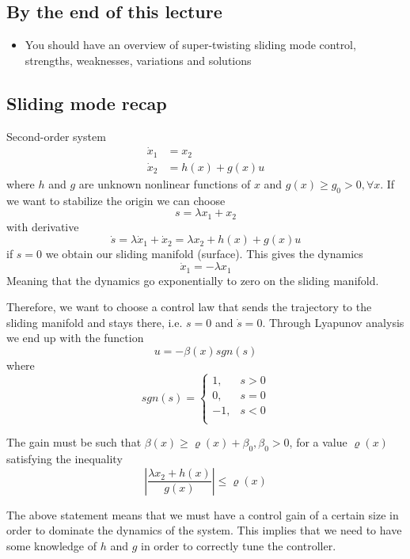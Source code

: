 \subsection{By the end of this lecture}
\begin{itemize}
    \item You should have an overview of super-twisting sliding mode control, strengths, weaknesses, variations and solutions
\end{itemize}

\subsection{Sliding mode recap}
Second-order system 
\begin{equation*}
    \begin{split}
        \dot{x}_1 &= x_2 \\
        \dot{x}_2 &= h(x) + g(x)u
    \end{split}
\end{equation*}
where $h$ and $g$ are unknown nonlinear functions of $x$ and $g(x) \geq g_0 > 0, \forall x$. If we want to stabilize the origin we can choose 
\begin{equation*}
    s = \lambda x_1 + x_2
\end{equation*}
with derivative 
\begin{equation*}
    \dot{s} = \lambda\dot{x}_1 + \dot{x}_2 = \lambda x_2 + h(x) + g(x)u
\end{equation*}
if $s = 0$ we obtain our sliding manifold (surface). 
This gives the dynamics
\begin{equation*}
    \dot{x}_1 = -\lambda x_1
\end{equation*}
Meaning that the dynamics go exponentially to zero on the sliding manifold.

Therefore, we want to choose a control law that sends the trajectory to the sliding manifold and stays there, i.e. $s = 0$ and $\dot{s} = 0$. Through Lyapunov analysis we end up with the function
\begin{equation*}
    u = -\beta(x) sgn (s)
\end{equation*}
where 
\begin{equation*}
    sgn(s) = 
    \begin{cases}
        1, &s > 0 \\
        0, &s = 0 \\
        -1, &s < 0 \\
    \end{cases}
\end{equation*}

The gain must be such that $\beta(x) \geq \varrho(x) + \beta_0, \beta_0 > 0$, for a value $\varrho(x)$ satisfying the inequality
\begin{equation*}
    \left|\frac{\lambda x_2 + h(x)}{g(x)}\right| \leq \varrho(x)
\end{equation*}

\begin{rmk}
    The above statement means that we must have a control gain of a certain size in order to dominate the dynamics of the system. This implies that we need to have some knowledge of $h$ and $g$ in order to correctly tune the controller.
\end{rmk}